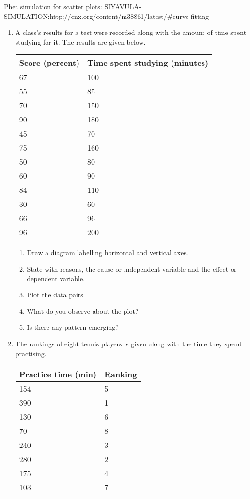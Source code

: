 Phet simulation for scatter plots: SIYAVULA-SIMULATION:http://cnx.org/content/m38861/latest/#curve-fitting
{
\begin{enumerate}
\item A class's results for a test were recorded along with the amount of time spent studying for it. The results are given below.
\begin{center}
\begin{tabular}{|l|l|}
\hline
Score (percent) & Time spent studying (minutes)  \\ 
\hline
67 & 100  \\
55 & 85  \\
70 & 150  \\
90 & 180  \\
45 & 70  \\
75 & 160  \\
50 & 80  \\
60 & 90  \\
84 & 110  \\
30 & 60  \\
66 & 96  \\
96 & 200  \\
\hline
\end{tabular}
\end{center}

	\begin{enumerate}
	\item Draw a diagram labelling horizontal and vertical axes. 
	\item State with reasons, the cause or independent variable and the effect or dependent variable.
	\item Plot the data pairs
	\item What do you observe about the plot?
	\item Is there any pattern emerging? 
	\end{enumerate}
\item The rankings of eight tennis players is given along with the time they spend practising.

\begin{center}
\begin{tabular}{|l|l|}
\hline
Practice time (min) & Ranking  \\ 
\hline
154 & 5 \\
390 & 1 \\
130 & 6 \\
70  & 8 \\
240 & 3 \\
280 & 2 \\
175 & 4 \\
103 & 7 \\
\hline
\end{tabular}
\end{center}


\end{enumerate}}
